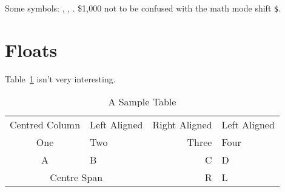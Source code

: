 \documentclass{article}
\begin{document}
Some symbols: , , . \$1,000 not to be
confused with the math mode shift \verb|$|.

\lipsum[8-9]

\section{Floats}
\label{sec:floats}

Table~\ref{tab:sample} isn't very interesting.

\begin{table}[htbp]
\caption{A Sample Table}
\label{tab:sample}
\centering
\begin{tabular}{clrl}
Centred Column & Left Aligned & Right Aligned & Left Aligned\\
One & Two & Three & Four\\
A & B & C & D\\
\multicolumn{2}{|c|}{Centre Span} & R & L
\end{tabular}
\end{table}



\end{document}
